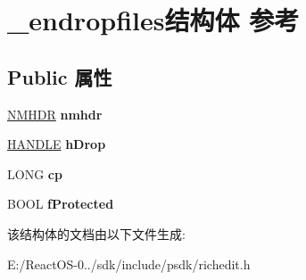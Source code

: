 \hypertarget{struct__endropfiles}{}\section{\+\_\+endropfiles结构体 参考}
\label{struct__endropfiles}
\subsection*{Public 属性}
\begin{DoxyCompactItemize}
\item 
\mbox{\label{struct__endropfiles_afbfa89b6c6c627e3553fd498a6d0f54d}} 
\hyperlink{structtag_n_m_h_d_r}{N\+M\+H\+DR} {\bfseries nmhdr}
\item 
\mbox{\label{struct__endropfiles_a6e50c9ec9737c4fdc0871ce8ec1a74e2}} 
\hyperlink{interfacevoid}{H\+A\+N\+D\+LE} {\bfseries h\+Drop}
\item 
\mbox{\label{struct__endropfiles_a39ddd6bd75e1f161734e3c5a9f92dec4}} 
L\+O\+NG {\bfseries cp}
\item 
\mbox{\label{struct__endropfiles_ada84c80785c029a94d87606992e06b8d}} 
B\+O\+OL {\bfseries f\+Protected}
\end{DoxyCompactItemize}


该结构体的文档由以下文件生成\+:\begin{DoxyCompactItemize}
\item 
E\+:/\+React\+O\+S-\/0../sdk/include/psdk/richedit.\+h\end{DoxyCompactItemize}

